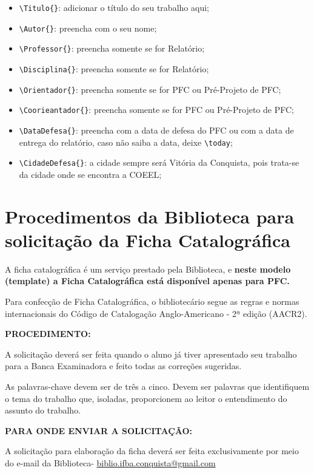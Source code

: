 \begin{itemize}
    \item {\Large \verb|\Titulo{}|:} adicionar o título do seu trabalho aqui;
    \item {\Large \verb|\Autor{}|:} preencha com o seu nome;
    \item {\Large \verb|\Professor{}|:} preencha somente se for Relatório;
    \item {\Large \verb|\Disciplina{}|:} preencha somente se for Relatório;
    \item {\Large \verb|\Orientador{}|:} preencha somente se for PFC ou Pré-Projeto de PFC;
    \item {\Large \verb|\Coorieantador{}|:} preencha somente se for PFC ou Pré-Projeto de PFC;
    \item {\Large \verb|\DataDefesa{}|:} preencha com a data de defesa do PFC ou com a data de entrega do relatório, caso não saiba a data, deixe \verb|\today|;
    \item {\Large \verb|\CidadeDefesa{}|:} a cidade sempre será Vitória da Conquista, pois trata-se da cidade onde se encontra a COEEL;
\end{itemize}

\pagebreak\clearpage\newpage

\section{Procedimentos da Biblioteca para solicitação da Ficha Catalográfica}
\label{sec:Biblioteca}

A ficha catalográfica é um serviço prestado pela Biblioteca, e {\bf neste modelo (template) a Ficha Catalográfica está disponível apenas para PFC.}

Para confecção de Ficha Catalográfica, o bibliotecário segue as regras e normas
internacionais do Código de Catalogação Anglo-Americano - 2ª edição (AACR2).

{\bf PROCEDIMENTO:}

A solicitação deverá ser feita quando o aluno já tiver apresentado seu trabalho para a Banca Examinadora e feito todas as correções sugeridas.

As palavras-chave devem ser de três a cinco. Devem ser palavras que identifiquem o tema do trabalho que, isoladas, proporcionem ao leitor o entendimento do assunto do trabalho.

{\bf PARA ONDE ENVIAR A SOLICITAÇÃO:}

A solicitação para elaboração da ficha deverá ser feita exclusivamente por meio do e-mail da Biblioteca- \url{biblio.ifba.conquista@gmail.com}

